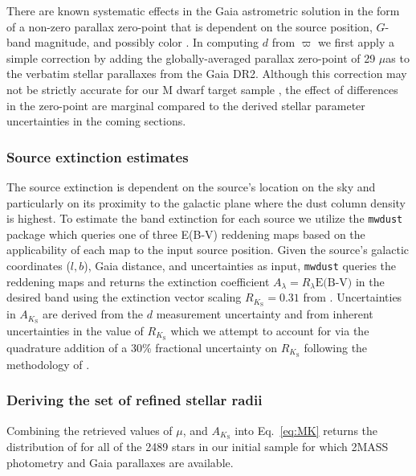 There are known systematic effects in the Gaia astrometric solution in the form of a non-zero parallax zero-point
that is dependent on the source position, $G$-band magnitude, and possibly color \citep{lindegren18}.
In computing $d$ from $\varpi$ we first apply a simple correction by adding the globally-averaged parallax
zero-point of 29 $\mu$as \citep{lindegren18} to the verbatim stellar parallaxes from the Gaia DR2. Although this
correction may not be strictly accurate for our M dwarf target sample \citep{leung19}, the effect of differences in
the zero-point are marginal compared to the derived stellar parameter uncertainties in the coming sections.

\subsubsection{Source extinction estimates} \label{sect:AK}
The source extinction is dependent on the source's location on the sky and particularly on
its proximity to the galactic plane where the dust column density is highest. To estimate the \Ks{-}band extinction
for each source we utilize the \texttt{mwdust} package \citep{bovy16} which queries one of three E(B-V) reddening maps
\citep[i.e.][]{drimmel03,marshall06,green15} based on the applicability of each map to the input source position.
Given the source's galactic coordinates ($l,b$), Gaia distance, and uncertainties as input, \texttt{mwdust}
queries the reddening maps and returns the extinction coefficient $A_{\lambda}=R_{\lambda} \text{E(B-V)}$ in the desired
band using the extinction vector scaling $R_{K_{\text{S}}}=0.31$ from \cite{schlafly11}. Uncertainties in $A_{K_{\text{S}}}$ are
derived from the $d$ measurement uncertainty and from inherent uncertainties in the value of $R_{K_{\text{S}}}$
\citep[e.g.]{green18}
which we attempt to account for via the quadrature addition of a 30\% fractional uncertainty on $R_{K_{\text{S}}}$ following
the methodology of \citep{fulton18}. 

\subsubsection{Deriving the set of refined stellar radii}
Combining the retrieved values of \Ks{,} $\mu$, and $A_{K_{\text{S}}}$ into Eq.~\ref{eq:MK} returns the
distribution of \MK{} for all of the 2489 stars in our initial sample for which 2MASS photometry and Gaia
parallaxes are available. \\

